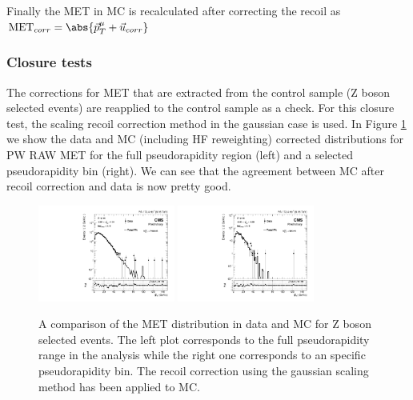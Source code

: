 Finally the MET in MC is recalculated after correcting the recoil as $\mathrm{MET}_{corr} = \abs{\vec{p}^{\mu}_{T} + \vec{u}_{corr}}$


\subsubsection{Closure tests}\label{sec:WBoson_Analysis_closureTests}

The corrections for MET that are extracted from the control sample (Z boson selected events) are reapplied to the control sample as a check. For this closure test, the scaling recoil correction method in the gaussian case is used. In Figure \ref{fig:recoilClosure} we show the data and MC (including HF reweighting) corrected distributions for PW RAW MET for the full pseudorapidity region (left) and a selected pseudorapidity bin (right). We can see that the agreement between MC after recoil correction and data is now pretty good.


\begin{figure}[!h]
\begin{center}
\includegraphics[width=0.4\textwidth]{Figures/WBoson/Analysis/Correction/Recoil/CheckFits/Z/Recoil_ScalingGauss/PLOT_MET_DATA_ZToMuMi_PA_Model_TEMP_DY_MuEtaCM_m286_193_MuIso_0_15.pdf}
\includegraphics[width=0.4\textwidth]{Figures/WBoson/Analysis/Correction/Recoil/CheckFits/Z/Recoil_ScalingGauss/PLOT_MET_DATA_ZToMuMi_PA_Model_TEMP_DY_MuEtaCM_m40_m20_MuIso_0_15.pdf} 
\caption{A comparison of the MET distribution in data and MC for Z boson selected events.
The left plot corresponds to the full pseudorapidity range in the analysis while the right one corresponds to an specific pseudorapidity bin. The recoil correction using the gaussian scaling method has been applied to MC.}
\label{fig:recoilClosure}
\end{center}
\end{figure}

